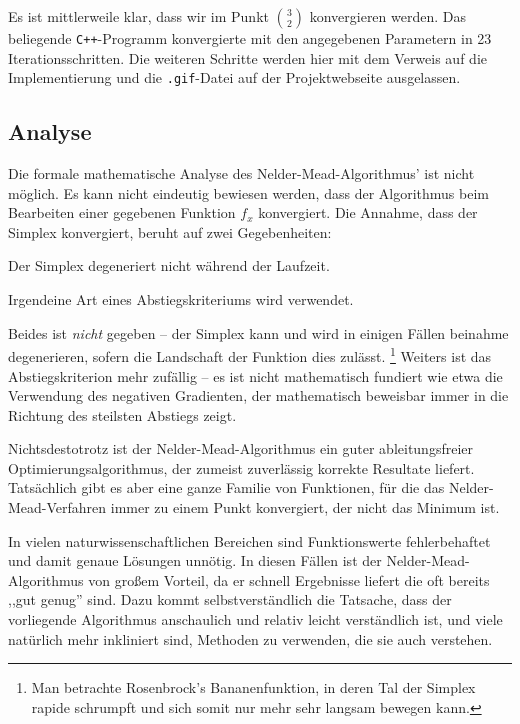 \documentclass[naustrian]{article}
\begin{document}
{Es ist mittlerweile klar, dass wir im Punkt $\binom{3}{2}$ konvergieren werden.
Das beliegende {\tt C++}-Programm konvergierte mit den angegebenen Parametern
in 23 Iterationsschritten. Die weiteren Schritte werden hier mit dem Verweis
auf die Implementierung und die {\tt .gif}-Datei auf der Projektwebseite ausgelassen.

\subsection{Analyse}

Die formale mathematische Analyse des Nelder-Mead-Algorithmus' ist nicht möglich.
Es kann nicht eindeutig bewiesen werden, dass der Algorithmus beim Bearbeiten einer gegebenen
Funktion $f_x$ konvergiert. Die Annahme, dass der Simplex konvergiert, beruht auf zwei
Gegebenheiten:

\begin{trivlist}
\item Der Simplex degeneriert nicht während der Laufzeit.
\item Irgendeine Art eines Abstiegskriteriums wird verwendet.
\end{trivlist}

Beides ist \emph{nicht} gegeben -- der Simplex kann und wird in einigen Fällen
beinahme degenerieren, sofern die Landschaft der Funktion dies
zulässt.
\footnote{Man betrachte Rosenbrock's Bananenfunktion, in deren Tal der Simplex
    rapide schrumpft und sich somit nur mehr sehr langsam bewegen
kann.} Weiters ist das Abstiegskriterion mehr zufällig -- es ist nicht mathematisch
fundiert wie etwa die Verwendung des negativen Gradienten, der mathematisch beweisbar
immer in die Richtung des steilsten Abstiegs zeigt. \cite{nelder-mead-scholarpedia}

Nichtsdestotrotz ist der Nelder-Mead-Algorithmus ein guter ableitungsfreier
Optimierungsalgorithmus, der zumeist zuverlässig korrekte Resultate liefert.
Tatsächlich gibt es aber eine ganze Familie von Funktionen, für die das Nelder-Mead-Verfahren
immer zu einem Punkt konvergiert, der nicht das Minimum ist\cite{nelder-mead-convergence}.

In vielen naturwissenschaftlichen Bereichen sind Funktionswerte fehlerbehaftet und damit
genaue Lösungen unnötig. In diesen Fällen ist der Nelder-Mead-Algorithmus von großem
Vorteil, da er schnell Ergebnisse liefert die oft bereits ,,gut genug'' sind.
Dazu kommt selbstverständlich die Tatsache, dass der vorliegende Algorithmus anschaulich
und relativ leicht verständlich ist, und viele natürlich mehr inkliniert sind, Methoden
zu verwenden, die sie auch verstehen.

}
\end{document}
